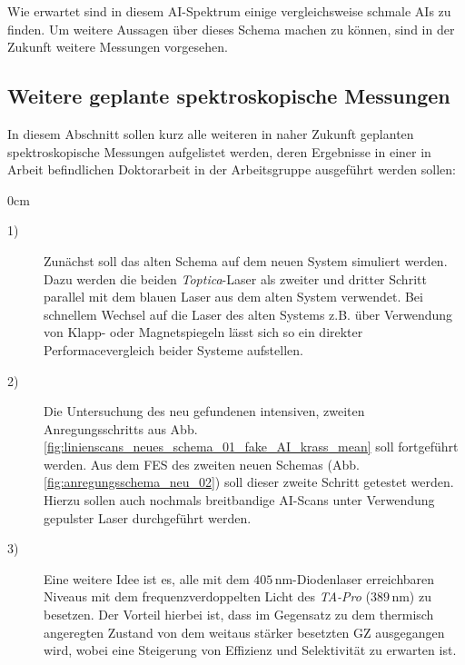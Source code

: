 % 		
Wie erwartet sind in diesem AI-Spektrum einige vergleichsweise schmale AIs zu
finden. Um weitere Aussagen über dieses Schema machen zu können, sind in der
Zukunft weitere Messungen vorgesehen.

\subsection{Weitere geplante spektroskopische
Messungen}\label{subsec:geplante_messungen}
In diesem Abschnitt sollen kurz alle weiteren in naher Zukunft geplanten
spektroskopische Messungen aufgelistet werden, deren Ergebnisse in einer in
Arbeit befindlichen Doktorarbeit \cite{hakimi:2012:dissertation} in der
Arbeitsgruppe ausgeführt werden sollen:
\begin{setlength}{\leftmargini}{0cm}
	\begin{description}
	\item[1)]Zunächst soll das alten Schema auf dem neuen System simuliert werden. Dazu
		werden die beiden \textit{Toptica}-Laser als zweiter und dritter Schritt
		parallel mit dem blauen Laser aus dem alten System verwendet. Bei schnellem
		Wechsel auf die Laser des alten Systems z.B. über Verwendung von Klapp- oder
		Magnetspiegeln lässt sich so ein direkter Performacevergleich beider Systeme
		aufstellen.
	\item[2)]Die Untersuchung des neu gefundenen intensiven, zweiten
		Anregungsschritts aus Abb.
		\ref{fig:linienscans_neues_schema_01_fake_AI_krass_mean} soll fortgeführt
		werden. Aus dem FES des zweiten neuen Schemas
		(Abb. \ref{fig:anregungsschema_neu_02}) soll dieser zweite Schritt getestet
		werden. Hierzu sollen auch nochmals breitbandige AI-Scans unter Verwendung
		gepulster Laser durchgeführt werden.
	\item[3)]Eine weitere Idee ist es, alle mit dem $405\,$nm-Diodenlaser erreichbaren
		Niveaus mit dem frequenzverdoppelten Licht des \textit{TA-Pro} ($389\,$nm) zu
		besetzen. Der Vorteil hierbei ist, dass im Gegensatz zu dem thermisch angeregten
		Zustand von dem weitaus stärker besetzten GZ ausgegangen wird, wobei eine
		Steigerung von Effizienz und Selektivität zu erwarten ist.
	\end{description}
\end{setlength} 


